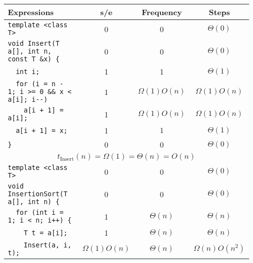 \documentclass{article}
\begin{document}
\begin{table}[H]
    \centering
    \begin{tabular}{|l|c|c|c|}
        \hline
        Expressions                                       & s/e                                 & Frequency       & Steps             \\
        \hline
        \verb|template <class T>|                         & 0                                   & 0               & $\Theta(0)$       \\
        \verb|void Insert(T a[], int n, const T &x) {|    & 0                                   & 0               & $\Theta(0)$       \\
        \verb|  int i;|                                   & 1                                   & 1               & $\Theta(1)$       \\
        \verb|  for (i = n - 1; i >= 0 && x < a[i]; i--)| & 1                                   & $\Omega(1)O(n)$ & $\Omega(1)O(n)$   \\
        \verb|    a[i + 1] = a[i];|                       & 1                                   & $\Omega(1)O(n)$ & $\Omega(1)O(n)$   \\
        \verb|  a[i + 1] = x;|                            & 1                                   & $1$             & $\Theta(1)$       \\
        \verb|}|                                          & 0                                   & 0               & $\Theta(0)$       \\
        \hline
        \multicolumn{4}{|c|}{$t_{\text{Insert}}(n) = \Omega(1) = \Theta(n)=O(n) $}                                                    \\
        \hline
        \verb|template <class T>|                         & 0                                   & 0               & $\Theta(0)$       \\
        \verb|void InsertionSort(T a[], int n) {|         & 0                                   & 0               & $\Theta(0)$       \\
        \verb|  for (int i = 1; i < n; i++) {|            & 1                                   & $\Theta(n)$     & $\Theta(n)$       \\
        \verb|    T t = a[i];|                            & 1                                   & $\Theta(n)$     & $\Theta(n)$       \\
        \verb|    Insert(a, i, t);|                       & $\Omega(1)O(n)$                     & $\Theta(n)$     & $\Omega(n)O(n^2)$ \\

\end{tabular}
\end{table}
\end{document}
